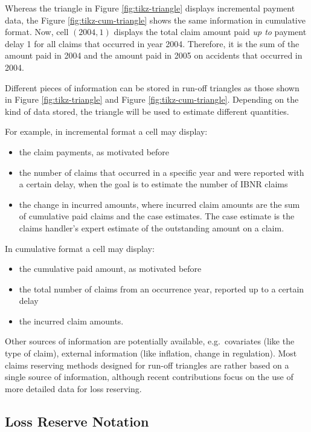 \documentclass[]{book}
\providecommand{\tightlist}{%
  \setlength{\itemsep}{0pt}\setlength{\parskip}{0pt}}
\begin{document}
Whereas the triangle in Figure \ref{fig:tikz-triangle} displays
incremental payment data, the Figure \ref{fig:tikz-cum-triangle} shows
the same information in cumulative format. Now, cell \((2004,1)\)
displays the total claim amount paid \emph{up to} payment delay 1 for
all claims that occurred in year 2004. Therefore, it is the sum of the
amount paid in 2004 and the amount paid in 2005 on accidents that
occurred in 2004.

Different pieces of information can be stored in run-off triangles as
those shown in Figure \ref{fig:tikz-triangle} and Figure
\ref{fig:tikz-cum-triangle}. Depending on the kind of data stored, the
triangle will be used to estimate different quantities.

For example, in incremental format a cell may display:

\begin{itemize}
\tightlist
\item
  the claim payments, as motivated before
\item
  the number of claims that occurred in a specific year and were
  reported with a certain delay, when the goal is to estimate the number
  of IBNR claims
\item
  the change in incurred amounts, where incurred claim amounts are the
  sum of cumulative paid claims and the case estimates. The case
  estimate is the claims handler's expert estimate of the outstanding
  amount on a claim.
\end{itemize}

In cumulative format a cell may display:

\begin{itemize}
\tightlist
\item
  the cumulative paid amount, as motivated before
\item
  the total number of claims from an occurrence year, reported up to a
  certain delay
\item
  the incurred claim amounts.
\end{itemize}

Other sources of information are potentially available, e.g.~covariates
(like the type of claim), external information (like inflation, change
in regulation). Most claims reserving methods designed for run-off
triangles are rather based on a single source of information, although
recent contributions focus on the use of more detailed data for loss
reserving.

\subsection{Loss Reserve Notation}\label{loss-reserve-notation}
\end{document}
